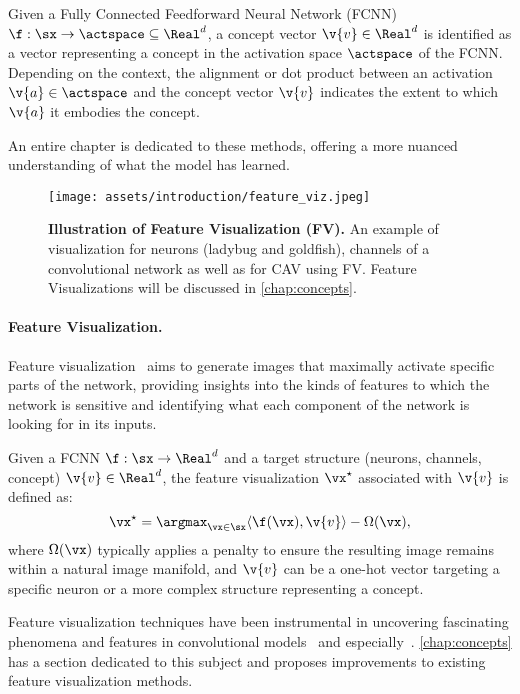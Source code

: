 \begin{definition}
\label{def:intro:cav}
Given a Fully Connected Feedforward Neural Network (FCNN) $\f : \sx \to \actspace \subseteq \Real^d$, a concept vector $\v{v} \in \Real^d$ is identified as a vector representing a concept in the activation space $\actspace$ of the FCNN. Depending on the context, the alignment or dot product between an activation $\v{a} \in \actspace$ and the concept vector $\v{v}$ indicates the extent to which $\v{a}$ it embodies the concept.
\end{definition}

An entire chapter is dedicated to these methods, offering a more nuanced understanding of what the model has learned.

\begin{figure}[ht]
    \centering
    \texttt{[image: assets/introduction/feature\_viz.jpeg]}
    \caption{\textbf{Illustration of Feature Visualization (FV).} An example of visualization for neurons (ladybug and goldfish), channels of a convolutional network as well as for CAV using FV. Feature Visualizations will be discussed in \autoref{chap:concepts}.}
    \label{fig:intro:fviz}
\end{figure}

\paragraph{Feature Visualization.}
Feature visualization~\cite{olah2017feature} aims to generate images that maximally activate specific parts of the network, providing insights into the kinds of features to which the network is sensitive and identifying what each component of the network is looking for in its inputs.

\begin{definition}
\label{def:intro:feature_viz}
Given a FCNN $\f : \sx \to \Real^d$ and a target structure (neurons, channels, concept) $\v{v} \in \Real^d$, the feature visualization $\vx^\star$ associated with $\v{v}$ is defined as:
\[
\vx^\star = \argmax_{\vx \in \sx} \langle \f(\vx), \v{v} \rangle - \Omega(\vx),
\]
where $\Omega(\vx)$ typically applies a penalty to ensure the resulting image remains within a natural image manifold, and $\v{v}$ can be a one-hot vector targeting a specific neuron or a more complex structure representing a concept.
\end{definition}

Feature visualization techniques have been instrumental in uncovering fascinating phenomena and features in convolutional models~\cite{nguyen2016multifaceted,nguyen2019understanding} and especially~\cite{cammarata2020thread}. \autoref{chap:concepts} has a section dedicated to this subject and proposes improvements to existing feature visualization methods.


